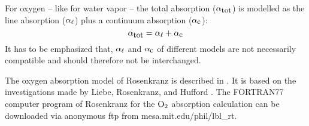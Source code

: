 {For oxygen -- like for water vapor -- the total absorption 
($\alpha_{\mbox{\rm \small tot}}$) is modelled as the line absorption ($\alpha_{\ell}$) plus a  
continuum absorption ($\alpha_{\mbox{\small c}}$):
\begin{equation}
  \label{eq:o2:totabs}
  \alpha_{\mbox{\rm \small tot}} = \alpha_{\ell} + \alpha_{\mbox{\small c}}
\end{equation}
It has to be emphasized that, $\alpha_{\ell}$ and $\alpha_{\mbox{\small c}}$ of different
models are not necessarily compatible and should therefore not be interchanged.




\label{leveld:O2_pwr98}


\label{levele:pwr93_o2lines}
The oxygen absorption model of Rosenkranz is described in \cite{pwr:93}. It 
is based on the investigations made by Liebe, Rosenkranz, and Hufford 
\cite{liebeetal:92}. The FORTRAN77 computer program of Rosenkranz for 
the $\mbox{O}_2$ absorption calculation can be downloaded via anonymous ftp from 
mesa.mit.edu/phil/lbl\_rt.

}
